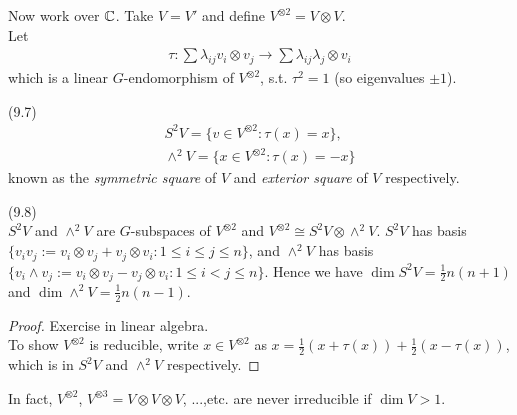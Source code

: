 \documentclass[a4paper]{article}
\begin{document}
Now work over $\mathbb{C}$. Take $V=V'$ and define $V^{\otimes 2} = V \otimes V$.\\
Let
\begin{equation*}
\begin{aligned}
\tau: \sum \lambda_{ij} v_i \otimes v_j \to \sum \lambda_{ij} \lambda_j \otimes v_i
\end{aligned}
\end{equation*}
which is a linear $G$-endomorphism of $V^{\otimes 2}$, s.t. $\tau^2 =1$ (so eigenvalues $\pm 1$).

\begin{defi} (9.7)\\
\begin{equation*}
\begin{aligned}
S^2 V = \{v \in V^{\otimes 2}: \tau(x) = x\},\\
\wedge^2 V = \{x \in V^{\otimes 2}: \tau(x) = -x\}
\end{aligned}
\end{equation*}
known as the \emph{symmetric square} of $V$ and \emph{exterior square} of $V$ respectively.
\end{defi}

\begin{lemma} (9.8)\\
$S^2 V$ and $\wedge^2 V$ are $G$-subspaces of $V^{\otimes 2}$ and $V^{\otimes 2} \cong S^2 V \otimes \wedge^2 V$. $S^2 V$ has basis $\{v_iv_j := v_i \otimes v_j + v_j \otimes v_i: 1 \leq i \leq j \leq n\}$, and $\wedge^2 V$ has basis $\{v_i \wedge v_j:=v_i \otimes v_j - v_j \otimes v_i: 1 \leq i < j \leq n\}$. Hence we have $\dim S^2 V = \frac{1}{2}n(n+1)$ and $\dim \wedge^2 V = \frac{1}{2} n(n-1)$.
\begin{proof}
Exercise in linear algebra.\\
To show $V^{\otimes 2}$ is reducible, write $x \in V^{\otimes 2}$ as $x=\frac{1}{2} (x+\tau(x)) + \frac{1}{2} (x-\tau(x))$, which is in $S^2 V$ and $\wedge^2 V$ respectively.
\end{proof}
\end{lemma}

In fact, $V^{\otimes 2}$, $V^{\otimes 3} = V \otimes V \otimes V$, ...,etc. are never irreducible if $\dim V > 1$.
\end{document}
